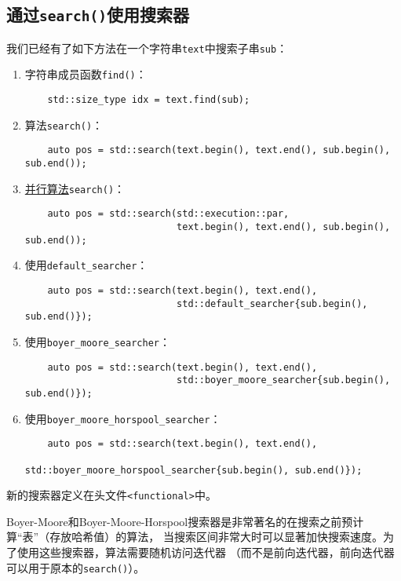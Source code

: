 \subsection{通过\texttt{search()}使用搜索器}
我们已经有了如下方法在一个字符串\texttt{text}中搜索子串\texttt{sub}：
\begin{enumerate}
    \item 字符串成员函数\texttt{find()}：
    \begin{lstlisting}
    std::size_type idx = text.find(sub);
    \end{lstlisting}
    \item 算法\texttt{search()}：
    \begin{lstlisting}
    auto pos = std::search(text.begin(), text.end(), sub.begin(), sub.end());
    \end{lstlisting}
    \item \hyperref[ch22]{并行算法}\texttt{search()}：
    \begin{lstlisting}
    auto pos = std::search(std::execution::par,
                           text.begin(), text.end(), sub.begin(), sub.end());
    \end{lstlisting}
    \item 使用\texttt{default\_searcher}：
    \begin{lstlisting}
    auto pos = std::search(text.begin(), text.end(),
                           std::default_searcher{sub.begin(), sub.end()});
    \end{lstlisting}
    \item 使用\texttt{boyer\_moore\_searcher}：
    \begin{lstlisting}
    auto pos = std::search(text.begin(), text.end(),
                           std::boyer_moore_searcher{sub.begin(), sub.end()});
    \end{lstlisting}
    \item 使用\texttt{boyer\_moore\_horspool\_searcher}：
    \begin{lstlisting}
    auto pos = std::search(text.begin(), text.end(),
                           std::boyer_moore_horspool_searcher{sub.begin(), sub.end()});
    \end{lstlisting}
\end{enumerate}
新的搜索器定义在头文件\texttt{<functional>}中。

Boyer-Moore和Boyer-Moore-Horspool搜索器是非常著名的在搜索之前预计算“表”（存放哈希值）的算法，
当搜索区间非常大时可以显著加快搜索速度。为了使用这些搜索器，算法需要随机访问迭代器
（而不是前向迭代器，前向迭代器可以用于原本的\texttt{search()}）。


